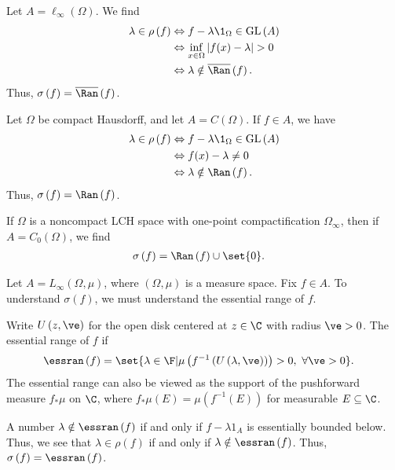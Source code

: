\documentclass[10pt]{mypackage}
\newcommand{\GL}{\text{GL}}
\begin{document}
\begin{example}
  Let $A = \ell_{\infty}\left(\Omega\right)$. We find
  \begin{align*}
    \lambda\in \rho\left(f\right) &\Leftrightarrow f - \lambda \1_{\Omega} \in \GL\left(A\right)\\
                                  &\Leftrightarrow \inf_{x\in\Omega}\left\vert f(x)-\lambda \right\vert > 0\\
                                  &\Leftrightarrow \lambda\notin \overline{\Ran}\left(f\right).
  \end{align*}
  Thus, $\sigma\left(f\right) = \overline{\Ran}\left(f\right)$.
\end{example}
\begin{example}
  Let $\Omega$ be compact Hausdorff, and let $A = C\left(\Omega\right)$. If $f\in A$, we have
  \begin{align*}
    \lambda\in \rho\left(f\right) &\Leftrightarrow f - \lambda \1_{\Omega}\in \GL\left(A\right)\\
                                  &\Leftrightarrow f(x) - \lambda \neq 0\\
                                  &\Leftrightarrow \lambda\notin \Ran\left(f\right).
  \end{align*}
  Thus, $\sigma\left(f\right) = \Ran\left(f\right)$.\newline

  If $\Omega$ is a noncompact LCH space with one-point compactification $\Omega_{\infty}$, then if $A = C_0\left(\Omega\right)$, we find
  \begin{align*}
    \sigma\left(f\right) &= \Ran\left(f\right) \cup \set{0}.
  \end{align*}
\end{example}
\begin{example}
  Let $A = L_{\infty}\left(\Omega,\mu\right)$, where $\left(\Omega,\mu\right)$ is a measure space. Fix $f\in A$. To understand $\sigma\left(f\right)$, we must understand the essential range of $f$.\newline

  Write $U\left(z,\ve\right)$ for the open disk centered at $z\in \C$ with radius $\ve > 0$. The essential range of $f$ if
  \begin{align*}
    \essran\left(f\right) &= \set{\lambda\in \F | \mu\left(f^{-1}\left(U\left(\lambda,\ve\right)\right)\right) > 0,~\forall \ve > 0}.
  \end{align*}
  The essential range can also be viewed as the support of the pushforward measure $f_{\ast}\mu$ on $\C$, where $f_{\ast}\mu\left(E\right) = \mu\left(f^{-1}\left(E\right)\right)$ for measurable $E\subseteq \C$.\newline

  A number $\lambda\notin \essran\left(f\right)$ if and only if $f - \lambda 1_A$ is essentially bounded below. Thus, we see that $\lambda\in \rho(f)$ if and only if $\lambda\notin \essran\left(f\right)$. Thus, $\sigma\left(f\right) = \essran\left(f\right)$.
\end{example}
\end{document}
